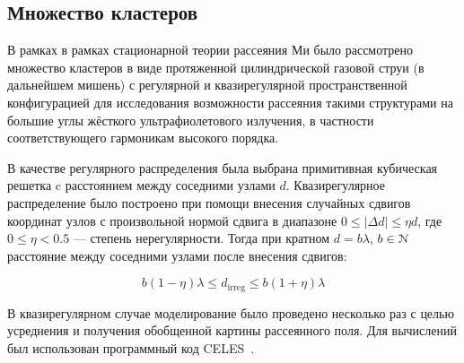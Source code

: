 \subsection{Множество кластеров}

В рамках в рамках стационарной теории рассеяния Ми было рассмотрено множество кластеров в виде протяженной цилиндрической газовой струи (в дальнейшем мишень) с регулярной и квазирегулярной пространственной конфигурацией для исследования возможности рассеяния такими структурами на большие углы жёсткого ультрафиолетового излучения, в частности соответствующего гармоникам высокого порядка.

В качестве регулярного распределения была выбрана примитивная кубическая решетка c расстоянием между соседними узлами $d$. Квазирегулярное распределение было построено при помощи внесения случайных сдвигов координат узлов с произвольной нормой сдвига в диапазоне $0 \leq |\Delta d| \leq \eta d$, где $0 \leq \eta < 0.5$ --- степень нерегулярности. Тогда при кратном $d = b\lambda$, $b \in \EuScript{N}$ расстояние между соседними узлами после внесения сдвигов:

    \begin{equation}
        b\left(1 - \eta\right)\lambda \le d_{\textrm{irreg}} \le b\left(1 + \eta\right)\lambda
    \end{equation}

В квазирегулярном случае моделирование было проведено несколько раз с целью усреднения и получения обобщенной картины рассеянного поля. Для вычислений был использован программный код CELES~\cite{celes}.



% 

